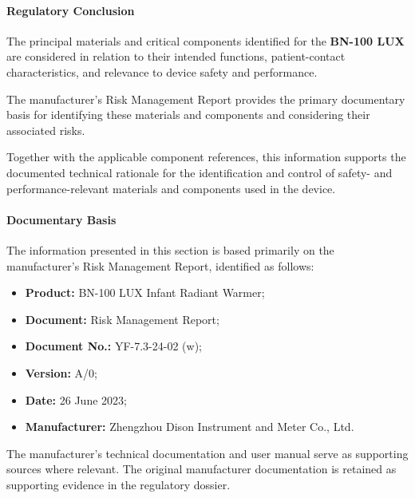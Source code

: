 \paragraph{Regulatory Conclusion}

The principal materials and critical components identified for the
\textbf{BN-100 LUX} are considered in relation to their intended
functions, patient-contact characteristics, and relevance to device
safety and performance.

The manufacturer's Risk Management Report provides the primary
documentary basis for identifying these materials and components
and considering their associated risks.

Together with the applicable component references, this information
supports the documented technical rationale for the identification
and control of safety- and performance-relevant materials and
components used in the device.

\paragraph{Documentary Basis}

The information presented in this section is based primarily on the
manufacturer's Risk Management Report, identified as follows:

\begin{itemize}
    \item \textbf{Product:} BN-100 LUX Infant Radiant Warmer;
    \item \textbf{Document:} Risk Management Report;
    \item \textbf{Document No.:} YF-7.3-24-02 (w);
    \item \textbf{Version:} A/0;
    \item \textbf{Date:} 26 June 2023;
    \item \textbf{Manufacturer:} Zhengzhou Dison Instrument and Meter
    Co., Ltd.
\end{itemize}

The manufacturer's technical documentation and user manual serve
as supporting sources where relevant. The original manufacturer
documentation is retained as supporting evidence in the
regulatory dossier.
